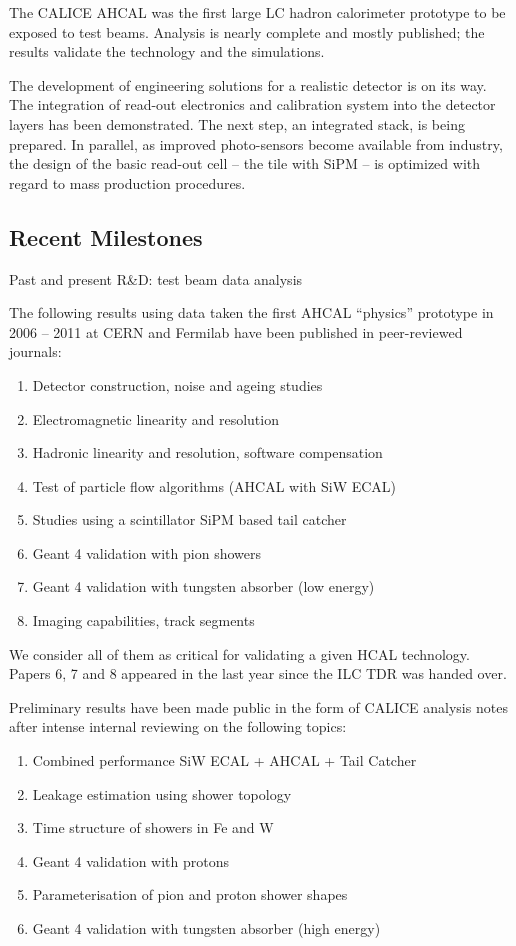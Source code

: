 The CALICE AHCAL was the first large LC hadron calorimeter prototype to be exposed to test beams. Analysis is nearly complete and mostly published; the results validate the technology and the simulations. 

The development of engineering solutions for a realistic detector is on its way. The integration of read-out electronics and calibration system into the detector layers has been demonstrated. The next step, an integrated stack, is being prepared. In parallel, as improved photo-sensors become available from industry, the design of the basic read-out cell -- the tile with SiPM -- is optimized with regard to mass production procedures. 

\subsection{Recent Milestones}
Past and present R\&D: test beam data analysis

The following results using data taken the first AHCAL ``physics'' prototype in 2006 -- 2011 at CERN and Fermilab have been published in peer-reviewed journals:
\begin{enumerate}
\item Detector construction, noise and ageing studies  
\item Electromagnetic linearity and resolution  
\item Hadronic linearity and resolution, software compensation   
\item Test of particle flow algorithms (AHCAL with SiW ECAL)  
\item Studies using a scintillator SiPM based tail catcher  
\item Geant 4 validation with pion showers  
\item Geant 4 validation with tungsten absorber (low energy)  
\item Imaging capabilities, track segments  
\end{enumerate}

We consider all of them as critical for validating a given HCAL technology. Papers 6, 7 and 8 appeared in the last year since the ILC TDR was handed over. 

Preliminary results have been made public in the form of CALICE analysis notes after intense internal reviewing on the following topics:
\begin{enumerate}
\item Combined performance SiW ECAL + AHCAL + Tail Catcher   
\item Leakage estimation using shower topology  
\item Time structure of showers in Fe and W  
\item Geant 4 validation with protons   
\item Parameterisation of pion and proton shower shapes 
\item Geant 4 validation with tungsten absorber (high energy)
\end{enumerate}


